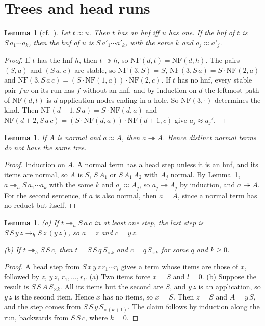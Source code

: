 \documentclass[11pt]{amsart}
\newtheorem{lemma}[theorem]{Lemma}
\theoremstyle{definition}
\newcommand{\red}{\twoheadrightarrow}
\newcommand{\hred}{\twoheadrightarrow_h}
\newcommand{\hstep}{\to_h}
\newcommand{\NF}{\mathrm{NF}}
\newcommand{\Sk}[1]{S_{\times#1}}
\begin{document}
\section{Trees and head runs}

\begin{lemma}[cf.~{\citep[Lemma~3]{s13}}]\label{lem:K}
Let $t\approx u$. Then $t$ has an hnf iff $u$ has one. If the hnf of $t$ is $S\,a_1\cdots a_k$,
then the hnf of $u$ is $S\,a'_1\cdots a'_k$, with the same $k$ and $a_j\approx a'_j$.
\end{lemma}

\begin{proof}
If $t$ has the hnf $h$, then $t\red h$, so $\NF(d,t)=\NF(d,h)$. The pairs $(S,a)$ and $(S\,a,c)$
are stable, so $\NF(3,S)=S$, $\NF(3,S\,a)=S\cdot\NF(2,a)$ and
$\NF(3,S\,a\,c)=(S\cdot\NF(1,a))\cdot\NF(2,c)$. If $t$ has no hnf, every stable pair $f\,w$ on its
run has $f$ without an hnf, and by induction on $d$ the leftmost path of $\NF(d,t)$ is $d$
application nodes ending in a hole. So $\NF(3,\cdot)$ determines the kind. Then
$\NF(d+1,S\,a)=S\cdot\NF(d,a)$ and $\NF(d+2,S\,a\,c)=(S\cdot\NF(d,a))\cdot\NF(d+1,c)$ give
$a_j\approx a_j'$.
\end{proof}

\begin{lemma}\label{lem:nf}
If $A$ is normal and $a\approx A$, then $a\red A$. Hence distinct normal terms do not have the same
tree.
\end{lemma}

\begin{proof}
Induction on $A$. A normal term has a head step unless it is an hnf, and its items are normal, so
$A$ is $S$, $S\,A_1$ or $S\,A_1\,A_2$ with $A_j$ normal. By Lemma~\ref{lem:K},
$a\hred S\,a_1\cdots a_k$ with the same $k$ and $a_j\approx A_j$, so $a_j\red A_j$ by induction,
and $a\red A$. For the second sentence, if $a$ is also normal, then $a=A$, since a normal term
has no reduct but itself.
\end{proof}

\begin{lemma}\label{lem:head}
\textup{(a)} If $t\hred S\,a\,c$ in at least one step, the last step is $S\,S\,y\,z\hstep S\,z\,(y\,z)$,
so $a=z$ and $c=y\,z$.

\textup{(b)} If $t\hred S\,S\,c$, then $t=S\,S\,q\,\Sk k$ and $c=q\,\Sk k$ for some $q$ and $k\ge0$.
\end{lemma}

\begin{proof}
A head step from $S\,x\,y\,z\,r_1\cdots r_l$ gives a term whose items are those of $x$, followed by
$z$, $y\,z$, $r_1,\dots,r_l$. (a) Two items force $x=S$ and $l=0$. (b) Suppose the result is
$S\,S\,A\,\Sk k$. All its items but the second are $S$, and $y\,z$ is an application, so $y\,z$ is
the second item. Hence $x$ has no items, so $x=S$. Then $z=S$ and $A=y\,S$, and the step comes
from $S\,S\,y\,\Sk{(k+1)}$. The claim follows by induction along the run, backwards from
$S\,S\,c$, where $k=0$.
\end{proof}
\end{document}
